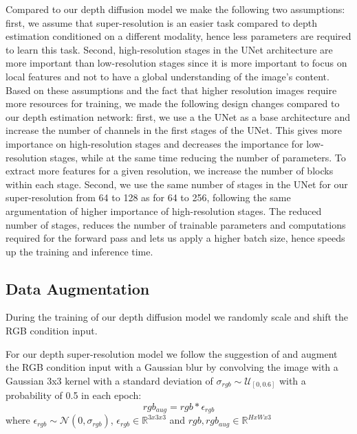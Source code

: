 Compared to our depth diffusion model we make the following two assumptions: first, we assume that super-resolution is an easier task compared to depth estimation conditioned on a different modality, hence less parameters are required to learn this task. Second, high-resolution stages in the UNet architecture are more important than low-resolution stages since it is more important to focus on local features and not to have a global understanding of the image's content. 
Based on these assumptions and the fact that higher resolution images require more resources for training, we made the following design changes compared to our depth estimation network: first, we use a the UNet as a base architecture and increase the number of channels in the first stages of the UNet. This gives more importance on high-resolution stages and decreases the importance for low-resolution stages, while at the same time reducing the number of parameters. To extract more features for a given resolution, we increase the number of blocks within each stage. Second, we use the same number of stages in the UNet for our super-resolution from 64 to 128 as for 64 to 256, following the same argumentation of higher importance of high-resolution stages. The reduced number of stages, reduces the number of trainable parameters and computations required for the forward pass and lets us apply a higher batch size, hence speeds up the training and inference time.


\subsection{Data Augmentation} \label{subsec:data_augmentation}

During the training of our depth diffusion model we randomly scale and shift the RGB condition input.

For our depth super-resolution model we follow the suggestion of \cite{ho_cascaded_2021} and augment the RGB condition input with a Gaussian blur by convolving the image with a Gaussian 3x3 kernel with a standard deviation of $\sigma_{rgb} \sim \mathcal{U}_{[0,0.6]}$ with a probability of 0.5 in each epoch:
\begin{equation}
\label{eq:rgb_aug}
    rgb_{aug} = rgb * \epsilon_{rgb}
\end{equation}
where $\epsilon_{rgb} \sim \mathcal{N}\left(0,\sigma_{rgb}\right)$, $\epsilon_{rgb} \in \mathbb{R}^{3x3x3}$ and $rgb,rgb_{aug} \in \mathbb{R}^{HxWx3}$

